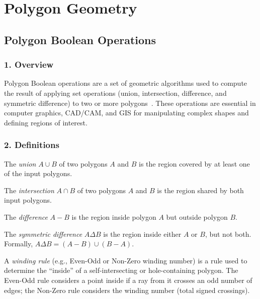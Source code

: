 \chapter{Polygon Geometry}
\label{ch:polygon_ops}

\section{Polygon Boolean Operations}
\label{sec:polygon_boolean}

\subsection{1. Overview}
Polygon Boolean operations are a set of geometric algorithms used to compute the result of applying set operations (union, intersection, difference, and symmetric difference) to two or more polygons~\cite{vatti1992}. These operations are essential in computer graphics, CAD/CAM, and GIS for manipulating complex shapes and defining regions of interest.

\subsection{2. Definitions}
\begin{definition}
\label{def:pb_union}
The \emph{union} $A \cup B$ of two polygons $A$ and $B$ is the region covered by at least one of the input polygons.
\end{definition}

\begin{definition}
\label{def:pb_intersection}
The \emph{intersection} $A \cap B$ of two polygons $A$ and $B$ is the region shared by both input polygons.
\end{definition}

\begin{definition}
\label{def:pb_difference}
The \emph{difference} $A - B$ is the region inside polygon $A$ but outside polygon $B$.
\end{definition}

\begin{definition}
\label{def:pb_sym_diff}
The \emph{symmetric difference} $A \Delta B$ is the region inside either $A$ or $B$, but not both. Formally, $A \Delta B = (A - B) \cup (B - A)$.
\end{definition}

\begin{definition}
\label{def:pb_winding}
A \emph{winding rule} (e.g., Even-Odd or Non-Zero winding number) is a rule used to determine the ``inside'' of a self-intersecting or hole-containing polygon. The Even-Odd rule considers a point inside if a ray from it crosses an odd number of edges; the Non-Zero rule considers the winding number (total signed crossings).
\end{definition}


